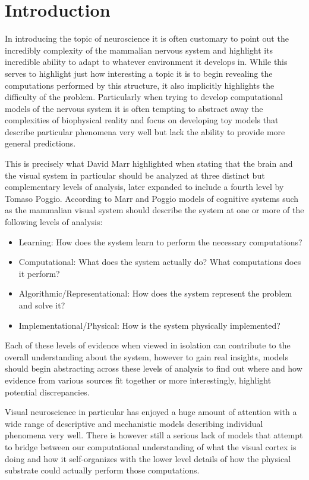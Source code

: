 \chapter{Introduction}

In introducing the topic of neuroscience it is often customary to
point out the incredibly complexity of the mammalian nervous system
and highlight its incredible ability to adapt to whatever environment
it develops in. While this serves to highlight just how interesting a
topic it is to begin revealing the computations performed by this
structure, it also implicitly highlights the difficulty of the
problem. Particularly when trying to develop computational models of
the nervous system it is often tempting to abstract away the
complexities of biophysical reality and focus on developing toy models
that describe particular phenomena very well but lack the ability to
provide more general predictions.

This is precisely what David Marr highlighted when stating that the
brain and the visual system in particular should be analyzed at three
distinct but complementary levels of analysis, later expanded to
include a fourth level by Tomaso Poggio. According to Marr and Poggio
models of cognitive systems such as the mammalian visual system should
describe the system at one or more of the following levels of
analysis:

\begin{itemize}
\item Learning: How does the system learn to perform the necessary computations?
\item Computational: What does the system actually do? What computations does it perform?
\item Algorithmic/Representational: How does the system represent the problem and solve it?
\item Implementational/Physical: How is the system physically implemented?
\end{itemize}

Each of these levels of evidence when viewed in isolation can
contribute to the overall understanding about the system, however to
gain real insights, models should begin abstracting across these
levels of analysis to find out where and how evidence from various
sources fit together or more interestingly, highlight potential
discrepancies.

Visual neuroscience in particular has enjoyed a huge amount of
attention with a wide range of descriptive and mechanistic models
describing individual phenomena very well. There is however still a
serious lack of models that attempt to bridge between our
computational understanding of what the visual cortex is doing and how
it self-organizes with the lower level details of how the physical
substrate could actually perform those computations.

